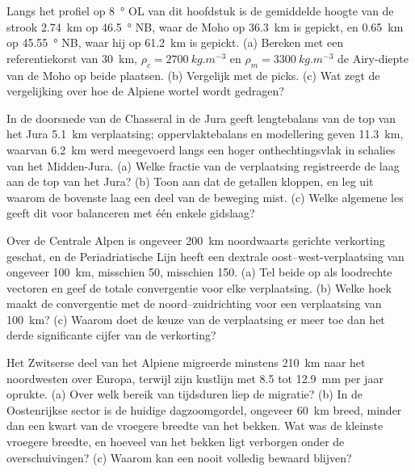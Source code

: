 \begin{exercise}[$\star\star$]\label{exo:b2:alpine-orogen:9}
Langs het profiel op \qty{8}{\degree} OL van dit hoofdstuk is de gemiddelde hoogte van de strook
\qty{2.74}{km} op \qty{46.5}{\degree} NB, waar de Moho op \qty{36.3}{km} is gepickt, en
\qty{0.65}{km} op \qty{45.55}{\degree} NB, waar hij op \qty{61.2}{km} is gepickt. (a) Bereken met een
referentiekorst van \qty{30}{km}, $\rho_c = \qty{2700}{kg.m^{-3}}$ en $\rho_m =
\qty{3300}{kg.m^{-3}}$ de Airy-diepte van de Moho op beide plaatsen. (b) Vergelijk met de
picks. (c) Wat zegt de vergelijking over hoe de Alpiene wortel wordt gedragen?
\end{exercise}

\begin{exercise}[$\star\star\star$]\label{exo:b2:alpine-orogen:10}
In de doorsnede van de Chasseral in de Jura geeft lengtebalans van de top van het Jura
\qty{5.1}{km} verplaatsing; oppervlaktebalans en modellering geven \qty{11.3}{km}, waarvan
\qty{6.2}{km} werd meegevoerd langs een hoger onthechtingsvlak in schalies van het Midden-Jura.
(a) Welke fractie van de verplaatsing registreerde de laag aan de top van het Jura? (b) Toon aan dat de
getallen kloppen, en leg uit waarom de bovenste laag een deel van de beweging mist. (c) Welke
algemene les geeft dit voor balanceren met één enkele gidslaag?
\end{exercise}

\begin{exercise}[$\star\star\star$]\label{exo:b2:alpine-orogen:11}
Over de Centrale Alpen is ongeveer \qty{200}{km} noordwaarts gerichte verkorting
geschat, en de Periadriatische Lijn heeft een dextrale oost--west-verplaatsing van ongeveer
\qty{100}{km}, misschien 50, misschien 150. (a) Tel beide op als loodrechte vectoren en geef
de totale convergentie voor elke verplaatsing. (b) Welke hoek maakt de convergentie met de
noord--zuidrichting voor een verplaatsing van \qty{100}{km}? (c) Waarom doet de keuze van de verplaatsing
er meer toe dan het derde significante cijfer van de verkorting?
\end{exercise}

\begin{exercise}[$\star\star\star$]\label{exo:b2:alpine-orogen:12}
Het Zwitserse deel van het Alpiene  migreerde minstens \qty{210}{km} naar het noordwesten
over Europa, terwijl zijn kustlijn met 8.5 tot \qty{12.9}{mm} per jaar oprukte. (a) Over welk bereik van
tijdsduren liep de migratie? (b) In de Oostenrijkse sector is de huidige dagzoomgordel,
ongeveer \qty{60}{km} breed, minder dan een kwart van de vroegere breedte van het bekken. Wat was de
kleinste vroegere breedte, en hoeveel van het bekken ligt verborgen onder de overschuivingen? (c) Waarom kan een
 nooit volledig bewaard blijven?
\end{exercise}


